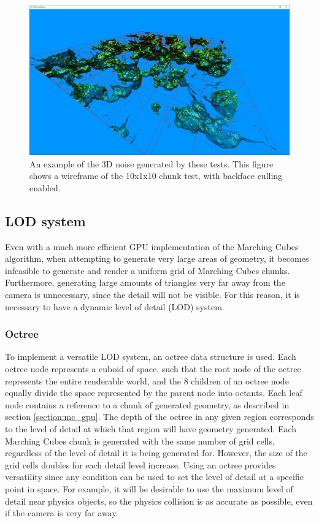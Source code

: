 \documentclass{article}
\begin{document}
\begin{figure}[H]
  \includegraphics[width=\textwidth]{10x10_wireframe.png}
  \caption{An example of the 3D noise generated by these tests. This figure shows a wireframe of the 10x1x10 chunk test, with backface culling enabled.}
\end{figure}

\subsection{LOD system}
Even with a much more efficient GPU implementation of the Marching Cubes algorithm, when attempting to generate very large areas of geometry, it becomes infeasible to generate and render a uniform grid of Marching Cubes chunks. Furthermore, generating large amounts of triangles very far away from the camera is unnecessary, since the detail will not be visible. For this reason, it is necessary to have a dynamic level of detail (LOD) system.

\subsubsection{Octree}
\label{section:octree}
To implement a versatile LOD system, an octree data structure is used. %
Each octree node represents a cuboid of space, such that the root node of the octree represents the entire renderable world, and the 8 children of an octree node equally divide the space represented by the parent node into octants. Each leaf node contains a reference to a chunk of generated geometry, as described in section \ref{section:mc_gpu}. The depth of the octree in any given region corresponds to the level of detail at which that region will have geometry generated. Each Marching Cubes chunk is generated with the same number of grid cells, regardless of the level of detail it is being generated for. However, the size of the grid cells doubles for each detail level increase. Using an octree provides versatility since any condition can be used to set the level of detail at a specific point in space. For example, it will be desirable to use the maximum level of detail near physics objects, so the physics collision is as accurate as possible, even if the camera is very far away.
\end{document}
